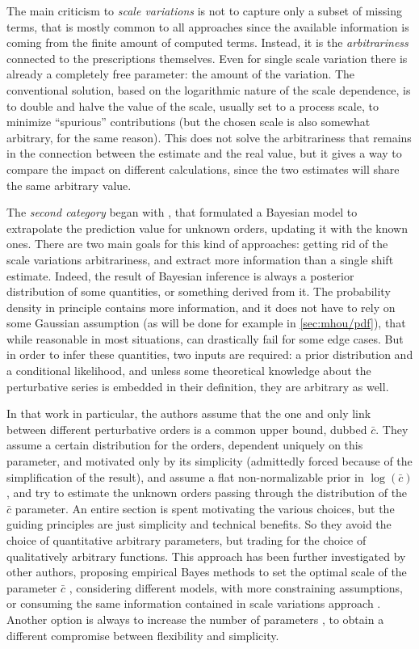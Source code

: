 The main criticism to \textit{scale variations} is not to capture only a subset
of missing terms, that is mostly common to all approaches since the available
information is coming from the finite amount of computed terms.
Instead, it is the \textit{arbitrariness} connected to the prescriptions
themselves.
%
Even for single scale variation there is already a completely free parameter:
the amount of the variation.
%
The conventional solution, based on the logarithmic nature of the scale
dependence, is to double and halve the value of the scale, usually set to a
process scale, to minimize \enquote{spurious} contributions (but the chosen
scale is also somewhat arbitrary, for the same reason).
%
This does not solve the arbitrariness that remains in the connection between
the estimate and the real value, but it gives a way to compare the impact on
different calculations, since the two estimates will share the same arbitrary
value.

The \textit{second category} began with \cite{Cacciari:2011ze}, that formulated
a Bayesian model to extrapolate the prediction value for unknown orders,
updating it with the known ones.
%
There are two main goals for this kind of approaches: getting rid of the
scale variations arbitrariness, and extract more information than a single
shift estimate.
Indeed, the result of Bayesian inference is always a posterior distribution of
some quantities, or something derived from it.
%
The probability density in principle contains more information, and it does not
have to rely on some Gaussian assumption (as will be done for example in
\cref{sec:mhou/pdf}), that while reasonable in most situations, can drastically
fail for some edge cases.
%
But in order to infer these quantities, two inputs are required: a prior
distribution and a conditional likelihood, and unless some theoretical
knowledge about the perturbative series is embedded in their definition, they
are arbitrary as well.

In that work in particular, the authors assume that the one and only link
between different perturbative orders is a common upper bound, dubbed
$\bar{c}$.
They assume a certain distribution for the orders, dependent uniquely on this
parameter, and motivated only by its simplicity (admittedly forced because of
the simplification of the result), and assume a flat non-normalizable prior in
$\log(\bar{c})$, and try to estimate the unknown orders passing through the
distribution of the $\bar{c}$ parameter.
%
An entire section is spent motivating the various choices, but the guiding
principles are just simplicity and technical benefits.
So they avoid the choice of quantitative arbitrary parameters, but trading for
the choice of qualitatively arbitrary functions.
%
This approach has been further investigated by other authors, proposing
empirical Bayes methods to set the optimal scale of the parameter $\bar{c}$
\cite{Forte:2013mda}, considering different models, with more constraining
assumptions, or consuming the same information contained in scale variations
approach \cite{Bonvini:2020xeo}.
Another option is always to increase the number of parameters
\cite{Duhr:2021mfd}, to obtain a different compromise between flexibility and
simplicity.

